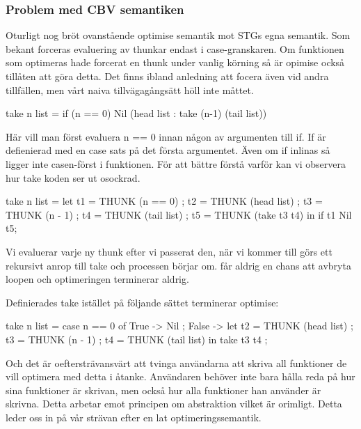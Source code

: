 \documentclass[../Optimise]{subfiles}
\begin{document}
\subsubsection{Problem med CBV semantiken}

Oturligt nog bröt ovanstående optimise semantik mot STGs egna semantik. 
Som bekant forceras evaluering av thunkar endast i case-granskaren. 
Om funktionen som optimeras hade forcerat en thunk under vanlig körning så är
 opimise också tillåten att göra detta. Det finns ibland anledning att focera
 även vid andra tillfällen, men vårt naiva tillvägagångsätt höll inte måttet.

\begin{codeEx}
take n list = if (n == 0) Nil (head list : take (n-1) (tail list))
\end{codeEx}
Här vill man först evaluera n == 0 innan någon av argumenten till if.
If är defienierad med en case sats på det första argumentet. Även om
if inlinas så ligger inte casen-först i funktionen. För att bättre förstå varför kan vi observera hur take koden ser ut osockrad. 

\begin{codeEx}
take n list = let 
    { t1 = THUNK (n == 0)
    ; t2 = THUNK (head list)
    ; t3 = THUNK (n - 1)
    ; t4 = THUNK (tail list)
    ; t5 = THUNK (take t3 t4)
    } in  if t1 Nil t5;
\end{codeEx}

Vi evaluerar varje ny thunk efter vi passerat den, när vi kommer till 
 görs ett rekursivt anrop till take och processen börjar om.
 får aldrig en chans att avbryta loopen och optimeringen terminerar aldrig.

Definierades take istället på följande sättet terminerar optimise:

\begin{codeEx}
take n list = case n == 0 of
    { True -> Nil
    ; False -> let 
        { t2 = THUNK (head list)
        ; t3 = THUNK (n - 1)
        ; t4 = THUNK (tail list)
        } in  take t3 t4
    };
\end{codeEx}


Och det är oeftersträvansvärt att tvinga användarna att skriva all funktioner
de vill optimera med detta i åtanke. Användaren behöver inte bara hålla reda på 
hur sina funktioner är skrivan, men också hur alla funktioner han använder är skrivna. 
Detta arbetar emot principen om abstraktion vilket är orimligt. Detta leder oss in på vår strävan
efter en lat optimeringssemantik.
\end{document}
